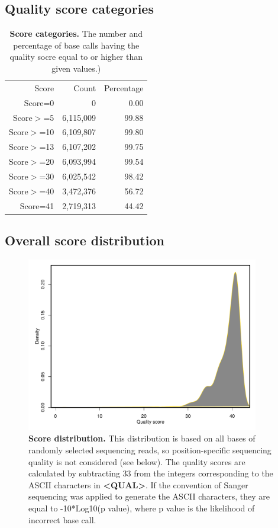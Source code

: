 \documentclass{article}
\begin{document}
\subsection{Quality score categories}
\begin{table}
\begin{tabular}{|r|r|r|}
  \hline
Score & Count & Percentage \\ 
  \rowcolor[gray]{0.9} \hline
Score=0 &         0 &  0.00 \\ 
  Score$>$=5 & 6,115,009 & 99.88 \\ 
   \rowcolor[gray]{0.9}Score$>$=10 & 6,109,807 & 99.80 \\ 
  Score$>$=13 & 6,107,202 & 99.75 \\ 
   \rowcolor[gray]{0.9}Score$>$=20 & 6,093,994 & 99.54 \\ 
  Score$>$=30 & 6,025,542 & 98.42 \\ 
   \rowcolor[gray]{0.9}Score$>$=40 & 3,472,376 & 56.72 \\ 
  Score=41 & 2,719,313 & 44.42 \\ 
   \hline
\end{tabular}\caption{\textbf{Score categories.} The number and percentage of base calls having the quality socre equal to or higher than given values.)}
\end{table}

\subsection{Overall score distribution}

\begin{center}
\begin{figure}
\includegraphics[width=4in, height=3in]{bamchop-qual-distribution}
\caption{\textbf{Score distribution.} This distribution is based on all bases of randomly selected sequencing reads, so position-specific sequencing quality is not considered (see below). The quality scores are calculated by subtracting 33 from the integers corresponding to the ASCII characters in \textbf{<QUAL>}. If the convention of Sanger sequencing was applied to generate the ASCII characters, they are equal to -10*Log10(p value), where p value is the likelihood of incorrect base call.}
\end{figure}
\end{center}
\end{document}
